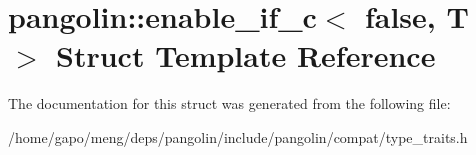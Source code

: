 \hypertarget{structpangolin_1_1enable__if__c_3_01false_00_01_t_01_4}{}\section{pangolin\+:\+:enable\+\_\+if\+\_\+c$<$ false, T $>$ Struct Template Reference}
\label{structpangolin_1_1enable__if__c_3_01false_00_01_t_01_4}


The documentation for this struct was generated from the following file\+:\begin{DoxyCompactItemize}
\item 
/home/gapo/meng/deps/pangolin/include/pangolin/compat/type\+\_\+traits.\+h\end{DoxyCompactItemize}
